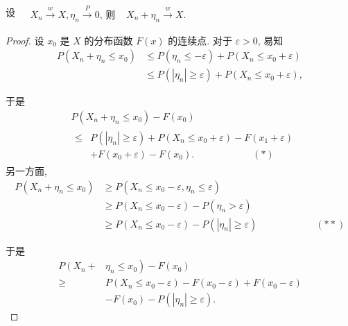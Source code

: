 \begin{theorem}
    设 $\begin{aligned} & X_n \stackrel{w}{\longrightarrow} X, \eta_n \stackrel{P}{\longrightarrow} 0 \text {, 则 }  & X_n+\eta_n \stackrel{w}{\longrightarrow} X .\end{aligned}$
\end{theorem}
{\small{
\begin{proof}
    设 $x_0$ 是 $X$ 的分布函数 $F(x)$ 的连续点. 对于 $\varepsilon>0$, 易知
$$
\begin{aligned}
P\left(X_n+\eta_n \leq x_0\right) & \leq P\left(\eta_n \leq-\varepsilon\right)+P\left(X_n \leq x_0+\varepsilon\right) \\
& \leq P\left(\left|\eta_n\right| \geqslant \varepsilon\right)+P\left(X_n \leq x_0+\varepsilon\right),
\end{aligned}
$$

于是
$$
\begin{aligned}
&P\left(X_n+\eta_n \leq x_0\right)-F\left(x_0\right)\\
&\begin{aligned}
\leq & P\left(\left|\eta_n\right| \geqslant \varepsilon\right)+P\left(X_n \leq x_0+\varepsilon\right)-F\left(x_1+\varepsilon\right) \\
& +F\left(x_0+\varepsilon\right)-F\left(x_0\right) . \qquad\qquad\qquad (*)
\end{aligned}
\end{aligned}
$$
另一方面,
$$
\begin{aligned}
P\left(X_n+\eta_n \leq x_0\right) & \geqslant P\left(X_n \leq x_0-\varepsilon, \eta_n \leq \varepsilon\right) \\
& \geqslant P\left(X_n \leq x_0-\varepsilon\right)-P\left(\eta_n>\varepsilon\right) \\
& \geqslant P\left(X_n \leq x_0-\varepsilon\right)-P\left(\left|\eta_n\right| \geqslant \varepsilon\right)\qquad\qquad\qquad (**)
\end{aligned}
$$

于是
$$
\begin{aligned}
P\left(X_n+\right. & \left.\eta_n \leq x_0\right)-F\left(x_0\right) \\
\geqslant & P\left(X_n \leq x_0-\varepsilon\right)-F\left(x_0-\varepsilon\right)+F\left(x_0-\varepsilon\right) \\
& -F\left(x_0\right)-P\left(\left|\eta_n\right| \geqslant \varepsilon\right) .
\end{aligned}
$$


\end{proof}}}

